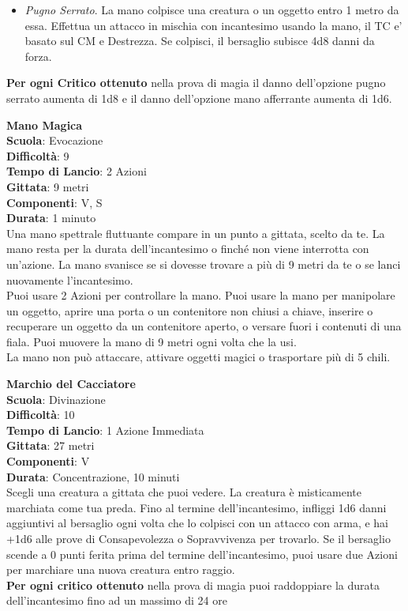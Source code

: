 \begin{multicols}{2}
\begin{itemize}
\item
\textit{Pugno Serrato}. La mano colpisce una creatura o un oggetto entro 1 metro da essa. Effettua un attacco in mischia con incantesimo usando la mano, il TC e' basato sul CM e Destrezza. Se colpisci, il bersaglio subisce 4d8 danni da forza.
\end{itemize}
\medskip
\textbf{Per ogni Critico ottenuto} nella prova di magia il danno dell'opzione pugno serrato aumenta di 1d8 e il danno dell'opzione mano afferrante aumenta di 1d6.

\medskip\textbf{Mano Magica}\\
\textbf{Scuola}: Evocazione\\
\textbf{Difficoltà}: 9\\
\textbf{Tempo di Lancio}: 2 Azioni\\
\textbf{Gittata}: 9 metri\\
\textbf{Componenti}: V, S\\
\textbf{Durata}: 1 minuto\\
Una mano spettrale fluttuante compare in un punto a gittata, scelto da te. La mano resta per la durata dell'incantesimo o finché non viene interrotta con un'azione. La mano svanisce se si dovesse trovare a più di 9 metri da te o se lanci nuovamente l'incantesimo.\\
Puoi usare 2 Azioni per controllare la mano. Puoi usare la mano per manipolare un oggetto, aprire una porta o un contenitore non chiusi a chiave, inserire o recuperare un oggetto da un contenitore aperto, o versare fuori i contenuti di una fiala. Puoi muovere la mano di 9 metri ogni volta che la usi.\\
La mano non può attaccare, attivare oggetti magici o trasportare più di 5 chili.

\medskip\textbf{Marchio del Cacciatore}\\
\textbf{Scuola}: Divinazione\\
\textbf{Difficoltà}: 10\\
\textbf{Tempo di Lancio}: 1 Azione Immediata\\
\textbf{Gittata}: 27 metri\\
\textbf{Componenti}: V\\
\textbf{Durata}: Concentrazione, 10 minuti\\
Scegli una creatura a gittata che puoi vedere. La creatura è misticamente marchiata come tua preda. Fino al termine dell'incantesimo, infliggi 1d6 danni aggiuntivi al bersaglio ogni volta che lo colpisci con un attacco con arma, e hai +1d6 alle prove di Consapevolezza o Sopravvivenza per trovarlo. Se il bersaglio scende a 0 punti ferita prima del termine dell'incantesimo, puoi usare due Azioni per marchiare una nuova creatura entro raggio.\\
\textbf{Per ogni critico ottenuto} nella prova di magia puoi raddoppiare la durata dell'incantesimo fino ad un massimo di 24 ore


\end{multicols}
